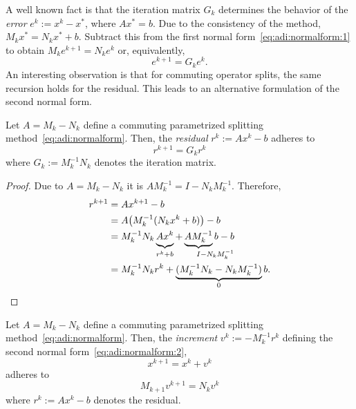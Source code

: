 A well known fact is that the iteration matrix $G_k$ determines
the behavior of the \emph{error} $e^k := x^k - x^*$, where $Ax^* = b$.
Due to the consistency of the method, $M_k x^* = N_k x^* + b$.
Subtract this from the first normal form~\eqref{eq:adi:normalform:1} to obtain
$M_k e^{k+1} = N_k e^k$ or, equivalently,
\begin{equation}
\label{eq:adi:error-recursion}
  e^{k+1} = G_k e^k
  .
\end{equation}
An interesting observation is that for commuting operator splits,
the same recursion holds for the residual.
This leads to an alternative formulation of the second normal form.

\begin{proposition}
\label{thm:adi:residual}
  Let $A = M_k - N_k$ define a commuting parametrized splitting method~\eqref{eq:adi:normalform}.
  Then, the \emph{residual} $r^k := Ax^k - b$ adheres to
  \begin{equation*}
    r^{k+1} = G_k r^k
  \end{equation*}
  where $G_k := M_k^{-1} N_k$ denotes the iteration matrix.
\end{proposition}
\begin{proof}
  Due to $A = M_k - N_k$ it is $AM_k^{-1} = I - N_k M_k^{-1}$.
  Therefore,
  \begin{align*}
    r^{k+1}
    &= Ax^{k+1} - b \\
    &= A \big( M_k^{-1} (N_k x^k + b) \big) - b \\
    &= M_k^{-1} N_k \underbrace{
      \vphantom{M_k^{-1}}
      Ax^k
    }_{
      \vphantom{M_k^{-1}}
      r^k + b
    }
    + \underbrace{
      A M_k^{-1}
    }_{
      I\mathrlap{{} - N_k M_k^{-1}}
    } b - b \\
    &= M_k^{-1} N_k r^k + \underbrace{
      (M_k^{-1} N_k - N_k M_k^{-1})
    }_0 b
    .
  \end{align*}
\end{proof}

\begin{corollary}
\label{thm:adi:increment-form}
  Let $A = M_k - N_k$ define a commuting parametrized splitting method~\eqref{eq:adi:normalform}.
  Then, the \emph{increment} $v^k := - M_k^{-1} r^k$ defining the second normal form~\eqref{eq:adi:normalform:2},
  \begin{equation*}
    x^{k+1} = x^k + v^k
  \end{equation*}
  adheres to
  \begin{equation*}
    M_{k+1} v^{k+1} = N_k v^k
  \end{equation*}
  where $r^k := Ax^k - b$ denotes the residual.
\end{corollary}

